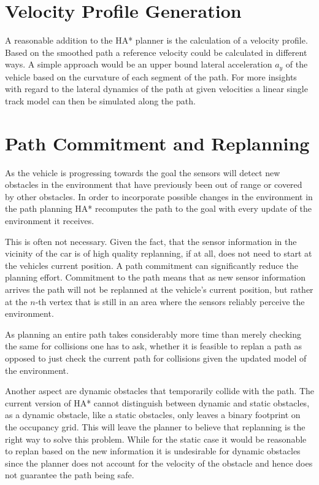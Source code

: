 \section{Velocity Profile Generation}
	A reasonable addition to the HA* planner is the calculation of a velocity profile. Based on the smoothed path a reference velocity could be calculated in different ways. A simple approach would be an upper bound lateral acceleration $a_y$ of the vehicle based on the curvature of each segment of the path. For more insights with regard to the lateral dynamics of the path at given velocities a linear single track model can then be simulated along the path.

\section{Path Commitment and Replanning}
	As the vehicle is progressing towards the goal the sensors will detect new obstacles in the environment that have previously been out of range or covered by other obstacles. In order to incorporate possible changes in the environment in the path planning HA* recomputes the path to the goal with every update of the environment it receives.
	
	This is often not necessary. Given the fact, that the sensor information in the vicinity of the car is of high quality replanning, if at all, does not need to start at the vehicles current position. A path commitment can significantly reduce the planning effort. Commitment to the path means that as new sensor information arrives the path will not be replanned at the vehicle's current position, but rather at the $n$-th vertex that is still in an area where the sensors reliably perceive the environment.
	
	As planning an entire path takes considerably more time than merely checking the same for collisions one has to ask, whether it is feasible to replan a path as opposed to just check the current path for collisions given the updated model of the environment.
	
	Another aspect are dynamic obstacles that temporarily collide with the path. The current version of HA* cannot distinguish between dynamic and static obstacles, as a dynamic obstacle, like a static obstacles, only leaves a binary footprint on the occupancy grid. This will leave the planner to believe that replanning is the right way to solve this problem. While for the static case it would be reasonable to replan based on the new information it is undesirable for dynamic obstacles since the planner does not account for the velocity of the obstacle and hence does not guarantee the path being safe.
	
